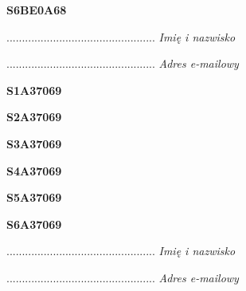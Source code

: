 \begin{turn}{90}\huge \textbf{S6BE0A68}\end{turn}

\begin{turn}{90}\begin{minipage}{\linewidth} \vspace{20mm} ................................................  \textit{Imię i nazwisko}\end{minipage}\end{turn}

\begin{turn}{90}\begin{minipage}{\linewidth} \vspace{20mm} ................................................  \textit{Adres e-mailowy}\end{minipage}\end{turn}

\begin{turn}{90}\huge \textbf{S1A37069}\end{turn}

\begin{turn}{90}\huge \textbf{S2A37069}\end{turn}

\begin{turn}{90}\huge \textbf{S3A37069}\end{turn}

\begin{turn}{90}\huge \textbf{S4A37069}\end{turn}

\begin{turn}{90}\huge \textbf{S5A37069}\end{turn}

\begin{turn}{90}\huge \textbf{S6A37069}\end{turn}

\begin{turn}{90}\begin{minipage}{\linewidth} \vspace{20mm} ................................................  \textit{Imię i nazwisko}\end{minipage}\end{turn}

\begin{turn}{90}\begin{minipage}{\linewidth} \vspace{20mm} ................................................  \textit{Adres e-mailowy}\end{minipage}\end{turn}

